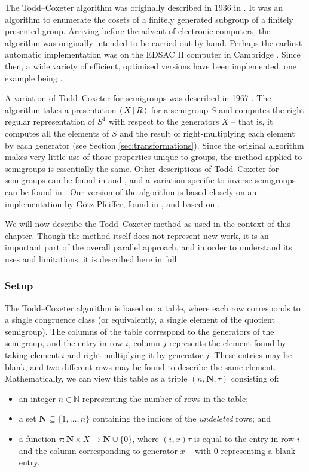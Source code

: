 The Todd--Coxeter algorithm was originally described in 1936 in
\cite{todd_coxeter_1936}.  It was an algorithm to enumerate the cosets of a
finitely generated subgroup of a finitely presented group.  Arriving before the
advent of electronic computers, the algorithm was originally intended to be
carried out by hand.  Perhaps the earliest automatic implementation was on the
EDSAC II computer in Cambridge \cite{leech_1963}.  Since then, a wide variety of
efficient, optimised versions have been implemented, one example being \ACE{}
\cite{ace}.

A variation of Todd--Coxeter for semigroups was described in 1967
\cite{neumann_1967}.  The algorithm takes a presentation $\left\langle\,X\,\middle|\,R\,\right\rangle$
for a semigroup $S$ and computes the right regular representation of $S^1$ with
respect to the generators $X$ -- that is, it computes all the elements of $S$ and
the result of right-multiplying each element by each generator (see Section
\ref{sec:transformations}).  Since the
original algorithm makes very little use of those properties unique to groups,
the method applied to semigroups is essentially the same.  Other descriptions of
Todd--Coxeter for semigroups can be found in \cite[Chapter 12]{ruskuc_thesis} and
\cite[Chapter 1.2]{walker_thesis}, and a variation specific to inverse
semigroups can be found in \cite{cutting_thesis}.  Our version of the algorithm
is based closely on an implementation by G\"otz Pfeiffer, found in
\cite[\texttt{lib/tcsemi.gi}]{gap}, and based on \cite{walker_thesis}.

We will now describe the Todd--Coxeter method as used in the context of this
chapter.  Though the method itself does not represent new work, it is an
important part of the overall parallel approach, and in order to understand its
uses and limitations, it is described here in full.

\subsubsection{Setup}

The Todd--Coxeter algorithm is based on a table, where each row corresponds to a
single congruence class (or equivalently, a single element of the quotient
semigroup).  The columns of the table correspond to the generators of the
semigroup, and the entry in row $i$, column $j$ represents the element found by
taking element $i$ and right-multiplying it by generator $j$.  These entries may
be blank, and two different rows may be found to describe the same element.
Mathematically, we can view this table as a triple $(n, \mathbf{N}, \tau)$
consisting of:
\begin{itemize}
\item an integer $n \in \mathbb{N}$ representing the number of rows in the table;
\item a set $\mathbf{N} \subseteq \{1, \ldots, n\}$ containing the indices of the
  \textit{undeleted} rows; and
\item a function $\tau: \mathbf{N} \times X \to \mathbf{N} \cup \{0\}$, where
  $(i, x)\tau$ is equal to the entry in row $i$ and the column corresponding to
  generator $x$ -- with $0$ representing a blank entry.
\end{itemize}


